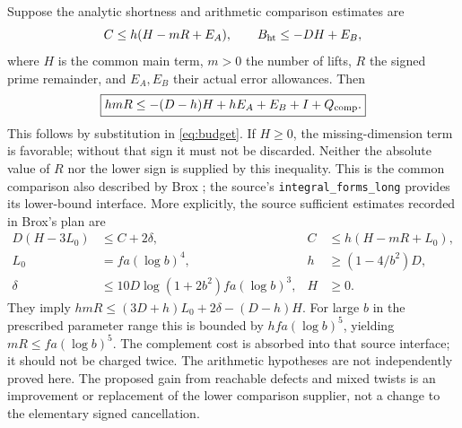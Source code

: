 \documentclass[11pt,a4paper]{article}
\begin{document}
Suppose the analytic shortness and arithmetic comparison estimates are
\begin{equation}\label{eq:two}
C\leq h(H-mR+E_A),\qquad B_{\rm ht}\leq-DH+E_B,
\end{equation}
where $H$ is the common main term, $m>0$ the number of lifts, $R$ the signed prime remainder, and $E_A,E_B$ their actual error allowances. Then
\begin{equation}\boxed{hmR\leq-(D-h)H+hE_A+E_B+I+Q_{\rm comp}.}\label{eq:mainbudget}\end{equation}
This follows by substitution in \eqref{eq:budget}. If $H\geq0$, the missing-dimension term is favorable; without that sign it must not be discarded. Neither the absolute value of $R$ nor the lower sign is supplied by this inequality. This is the common comparison also described by Brox \cite{broxplan}; the source's \texttt{integral\_\allowbreak forms\_\allowbreak long} provides its lower-bound interface. More explicitly, the source sufficient estimates recorded in Brox's plan are
\begin{align*}
D(H-3L_0)&\leq C+2\delta, & C&\leq h(H-mR+L_0),\\
L_0&=fa(\log b)^4, & h&\geq(1-4/b^2)D,\\
\delta&\leq10D\log(1+2b^2)fa(\log b)^3, & H&\geq0.
\end{align*}
They imply $hmR\leq (3D+h)L_0+2\delta-(D-h)H$. For large $b$ in the prescribed parameter range this is bounded by $hfa(\log b)^5$, yielding $mR\leq fa(\log b)^5$. The complement cost is absorbed into that source interface; it should not be charged twice. The arithmetic hypotheses are not independently proved here. The proposed gain from reachable defects and mixed twists is an improvement or replacement of the lower comparison supplier, not a change to the elementary signed cancellation.
\end{document}

